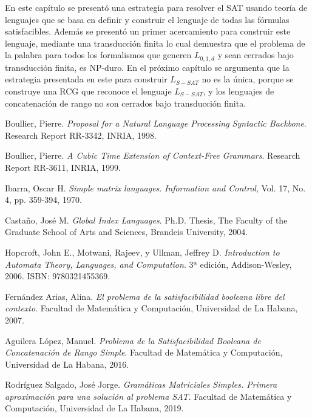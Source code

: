 \documentclass[12pt]{article}
\begin{document}
En este capítulo se presentó una estrategia para resolver el SAT usando teoría de lenguajes que se basa en 
definir y construir el lenguaje de todas las fórmulas satisfacibles. Además se presentó un primer acercamiento 
para construir este lenguaje, mediante una transducción finita lo cual demuestra que el problema de la palabra 
para todos los formalismos que generen $L_{0,1,d}$ y sean cerrados bajo transducción finita, es NP-duro.
En el próximo capítulo se argumenta que la estrategia presentada en este para construir $L_{S-SAT}$ no es la única,
porque se construye una RCG que reconoce el lenguaje $L_{S-SAT}$, y los lenguajes de concatenación de rango 
no son cerrados bajo transducción finita. 


\begin{thebibliography}{99}
    
    Boullier, Pierre.
    \textit{Proposal for a Natural Language Processing Syntactic Backbone}.
    Research Report RR-3342, INRIA, 1998.
    
    Boullier, Pierre.
    \textit{A Cubic Time Extension of Context-Free Grammars}.
    Research Report RR-3611, INRIA, 1999.
    
    Ibarra, Oscar H.
    \textit{Simple matrix languages}.
    \textit{Information and Control}, Vol. 17, No. 4, pp. 359-394, 1970.
    
    Castaño, José M.
    \textit{Global Index Languages}.
    Ph.D. Thesis, The Faculty of the Graduate School of Arts and Sciences, Brandeis University, 2004.
    
    Hopcroft, John E., Motwani, Rajeev, y Ullman, Jeffrey D.
    \textit{Introduction to Automata Theory, Languages, and Computation}.
    3ª edición, Addison-Wesley, 2006. ISBN: 9780321455369.
    
    Fernández Arias, Alina.
    \textit{El problema de la satisfacibilidad booleana libre del contexto}.
    Facultad de Matemática y Computación, Universidad de La Habana, 2007.
    
    Aguilera López, Manuel.
    \textit{Problema de la Satisfacibilidad Booleana de Concatenación de Rango Simple}.
    Facultad de Matemática y Computación, Universidad de La Habana, 2016.
    
    Rodríguez Salgado, José Jorge.
    \textit{Gramáticas Matriciales Simples. Primera aproximación para una solución al problema SAT}.
    Facultad de Matemática y Computación, Universidad de La Habana, 2019.
    
\end{thebibliography}
\end{document}
